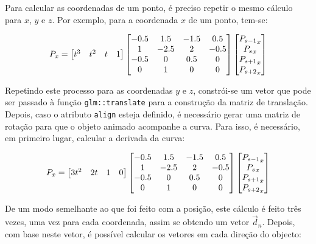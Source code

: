 \documentclass[12pt, a4paper]{article}
\begin{document}
Para calcular as coordenadas de um ponto, é preciso repetir o mesmo cálculo para $x$, $y$ e $z$. Por
exemplo, para a coordenada $x$ de um ponto, tem-se:

$$
\def\arraystretch{1}
P_x =
\begin{bmatrix} t^3 & t^2 & t & 1 \end{bmatrix}
\begin{bmatrix}
    -0.5 &  1.5 & -1.5 &  0.5 \\
       1 & -2.5 &    2 & -0.5 \\
    -0.5 &    0 &  0.5 &    0 \\
       0 &    1 &    0 &    0
\end{bmatrix}
\begin{bmatrix} {P_{s - 1}}_x \\ {P_{s}}_x \\ {P_{s + 1}}_x \\ {P_{s + 2}}_x \end{bmatrix}
$$

Repetindo este processo para as coordenadas $y$ e $z$, constrói-se um vetor que pode ser passado à
função \texttt{glm::translate} para a construção da matriz de translação. Depois, caso o atributo
\texttt{align} esteja definido, é necessário gerar uma matriz de rotação para que o objeto animado
acompanhe a curva. Para isso, é necessário, em primeiro lugar, calcular a derivada da curva:

$$
\def\arraystretch{1}
P_x =
\begin{bmatrix} 3 t^2 & 2 t & 1 & 0 \end{bmatrix}
\begin{bmatrix}
    -0.5 &  1.5 & -1.5 &  0.5 \\
       1 & -2.5 &    2 & -0.5 \\
    -0.5 &    0 &  0.5 &    0 \\
       0 &    1 &    0 &    0
\end{bmatrix}
\begin{bmatrix} {P_{s - 1}}_x \\ {P_{s}}_x \\ {P_{s + 1}}_x \\ {P_{s + 2}}_x \end{bmatrix}
$$

De um modo semelhante ao que foi feito com a posição, este cálculo é feito três vezes, uma vez para
cada coordenada, assim se obtendo um vetor $\vec{d}_n$. Depois, com base neste vetor, é possível
calcular os vetores em cada direção do objecto:
\end{document}
